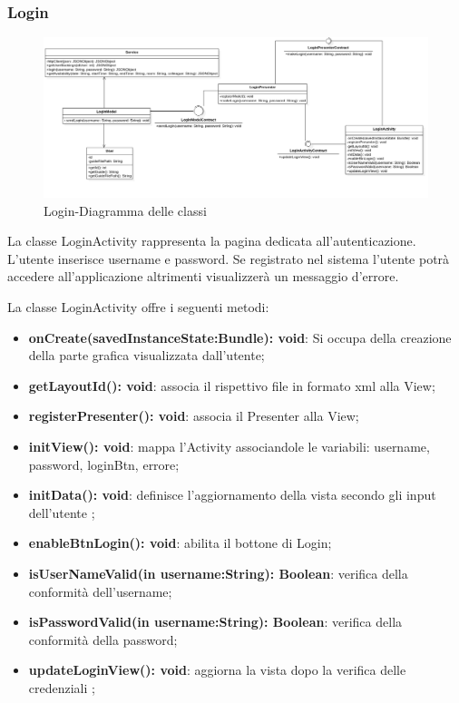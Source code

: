 \subsubsection{Login}
\begin{figure}[H]
	\centering
	\includegraphics[width=16cm]{res/images/loginClass.png}
	\caption{Login-Diagramma delle classi}
	\label{fig:Login-Diagramma delle classi}
\end{figure}
La classe LoginActivity rappresenta la pagina dedicata all'autenticazione. L'utente inserisce username e password. Se registrato nel sistema l'utente potrà accedere all'applicazione altrimenti visualizzerà un messaggio d'errore.

La classe LoginActivity offre i seguenti metodi:
\begin{itemize}
	\item \textbf{onCreate(savedInstanceState:Bundle): void}: Si occupa della creazione della parte grafica visualizzata dall'utente; 
	\item \textbf{getLayoutId(): void}: associa il rispettivo file in formato xml alla View;
	\item \textbf{registerPresenter(): void}: associa il Presenter alla View;
	\item \textbf{initView(): void}: mappa l'Activity associandole le variabili: username, password, loginBtn, errore;
	\item \textbf{initData(): void}: definisce l'aggiornamento della vista secondo gli input dell'utente ;
	\item \textbf{enableBtnLogin(): void}: abilita il bottone di Login;
	\item \textbf{isUserNameValid(in username:String): Boolean}: verifica della conformità dell'username;
	\item \textbf{isPasswordValid(in username:String): Boolean}: verifica della conformità della password;
	\item \textbf{updateLoginView(): void}: aggiorna la vista dopo la verifica delle credenziali ;
\end{itemize}

